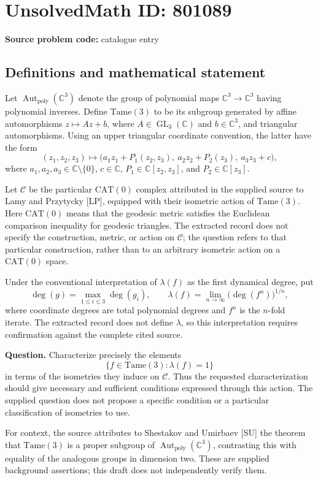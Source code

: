 \documentclass[11pt]{article}
\newcommand{\C}{\mathbb{C}}
\begin{document}
\section*{UnsolvedMath ID: 801089}
\textbf{Source problem code:} catalogue entry
\subsection{Definitions and mathematical statement}
Let \(\operatorname{Aut}_{\mathrm{poly}}(\C^3)\) denote the group of polynomial maps \(\C^3\to\C^3\) having polynomial inverses. Define \(\mathrm{Tame}(3)\) to be its subgroup generated by affine automorphisms \(z\mapsto Az+b\), where \(A\in\operatorname{GL}_3(\C)\) and \(b\in\C^3\), and triangular automorphisms. Using an upper triangular coordinate convention, the latter have the form
\[
(z_1,z_2,z_3)\longmapsto
\bigl(a_1z_1+P_1(z_2,z_3),\ a_2z_2+P_2(z_3),\ a_3z_3+c\bigr),
\]
where \(a_1,a_2,a_3\in\C\setminus\{0\}\), \(c\in\C\), \(P_1\in\C[z_2,z_3]\), and \(P_2\in\C[z_3]\).

Let \(\mathcal C\) be the particular \(\mathrm{CAT}(0)\) complex attributed in the supplied source to Lamy and Przytycky [LP], equipped with their isometric action of \(\mathrm{Tame}(3)\). Here \(\mathrm{CAT}(0)\) means that the geodesic metric satisfies the Euclidean comparison inequality for geodesic triangles. The extracted record does not specify the construction, metric, or action on \(\mathcal C\); the question refers to that particular construction, rather than to an arbitrary isometric action on a \(\mathrm{CAT}(0)\) space.

Under the conventional interpretation of \(\lambda(f)\) as the first dynamical degree, put
\[
\deg(g)=\max_{1\leq i\leq3}\deg(g_i),
\qquad
\lambda(f)=\lim_{n\to\infty}\bigl(\deg(f^n)\bigr)^{1/n},
\]
where coordinate degrees are total polynomial degrees and \(f^n\) is the \(n\)-fold iterate. The extracted record does not define \(\lambda\), so this interpretation requires confirmation against the complete cited source.

\textbf{Question.} Characterize precisely the elements
\[
\bigl\{f\in\mathrm{Tame}(3):\lambda(f)=1\bigr\}
\]
in terms of the isometries they induce on \(\mathcal C\). Thus the requested characterization should give necessary and sufficient conditions expressed through this action. The supplied question does not propose a specific condition or a particular classification of isometries to use.

For context, the source attributes to Shestakov and Umirbaev [SU] the theorem that \(\mathrm{Tame}(3)\) is a proper subgroup of \(\operatorname{Aut}_{\mathrm{poly}}(\C^3)\), contrasting this with equality of the analogous groups in dimension two. These are supplied background assertions; this draft does not independently verify them.
\end{document}

